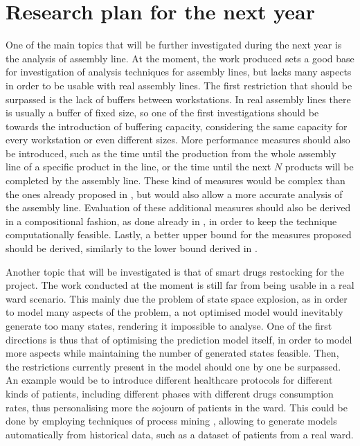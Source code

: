 
\section*{Research plan for the next year}

  One of the main topics that will be further investigated during the next year is the analysis of assembly line. At the moment, the work produced \cite{biagi2017inspection} sets a good base for investigation of analysis techniques for assembly lines, but lacks many aspects in order to be usable with real assembly lines. The first restriction that should be surpassed is the lack of buffers between workstations. In real assembly lines there is usually a buffer of fixed size, so one of the first investigations should be towards the introduction of buffering capacity, considering the same capacity for every workstation or even different sizes. More performance measures should also be introduced, such as the time until the production from the whole assembly line of a specific product in the line, or the time until the next $N$ products will be completed by the assembly line. These kind of measures would be complex than the ones already proposed in \cite{biagi2017inspection}, but would also allow a more accurate analysis of the assembly line. Evaluation of these additional measures should also be derived in a compositional fashion, as done already in \cite{biagi2017inspection}, in order to keep the technique computationally feasible. Lastly, a better upper bound for the measures proposed should be derived, similarly to the lower bound derived in \cite{biagi2017inspection}.
  
  Another topic that will be investigated is that of smart drugs restocking for the  project. The work conducted at the moment is still far from being usable in a real ward scenario. This mainly due the problem of state space explosion, as in order to model many aspects of the problem, a not optimised model would inevitably generate too many states, rendering it impossible to analyse. One of the first directions is thus that of optimising the prediction model itself, in order to model more aspects while maintaining the number of generated states feasible. Then, the restrictions currently present in the model should one by one be surpassed. An example would be to introduce different healthcare protocols for different kinds of patients, including different phases with different drugs consumption rates, thus personalising more the sojourn of patients in the ward. This could be done by employing techniques of process mining \cite{van2004workflow}, allowing to generate models automatically from historical data, such as a dataset of patients from a real ward.
  
